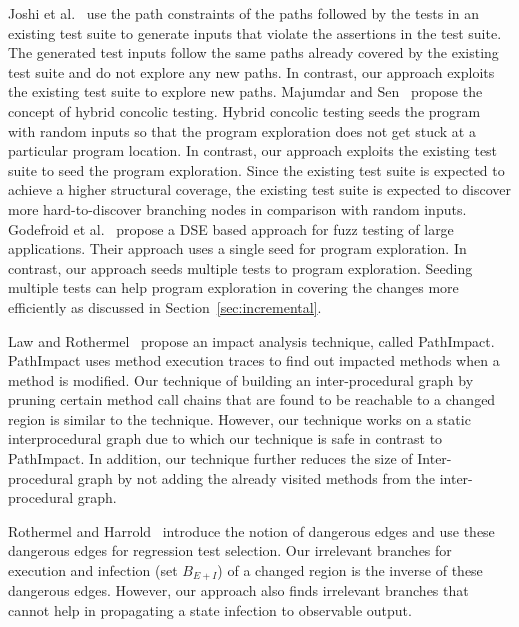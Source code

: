 Joshi et al.~\cite{joshi:pretext} use the path constraints of the paths followed by the tests in an existing test suite to generate inputs that violate the assertions in the test suite. The generated test inputs follow the same paths already covered by the existing test suite and do not explore any new paths. In contrast, our approach exploits the existing test suite to explore new paths. Majumdar and Sen~\cite{majumdar:hybrid} propose the concept of hybrid concolic testing. Hybrid concolic testing seeds the program with random inputs so that the program exploration does not get stuck at a particular program location. In contrast, our approach exploits the existing test suite to seed the program exploration. Since the existing test suite is expected to achieve a higher structural coverage, the existing test suite is expected to discover more hard-to-discover branching nodes in comparison with random inputs. Godefroid et al.~\cite{godefroid:fuzz} propose a DSE based approach for fuzz testing of large applications. Their approach uses a single seed for program exploration. In contrast, our approach  seeds multiple tests to program exploration. Seeding multiple tests can help program exploration in covering the changes more efficiently as discussed in Section~\ref{sec:incremental}. 

Law and Rothermel~\cite{Law-icse03} propose an impact analysis technique, called PathImpact. 
PathImpact uses method execution traces to find out impacted 
methods when a method is modified. Our technique of building an inter-procedural graph 
by pruning certain method call chains that are found to be reachable to a changed region
is similar to the technique. 
However, our technique works on a static interprocedural graph due to which our technique is safe in contrast to 
PathImpact. In addition, our technique further reduces the size of Inter-procedural graph by not adding the 
already visited methods from the inter-procedural graph.

Rothermel and Harrold~\cite{rothermel97} introduce the notion of dangerous 
edges and use these dangerous edges for regression test selection. 
Our irrelevant branches for execution and infection (set $B_{E+I}$) of 
a changed region is the inverse of these dangerous edges.
However, our approach also finds irrelevant branches that cannot help in propagating 
a state infection to observable output.


